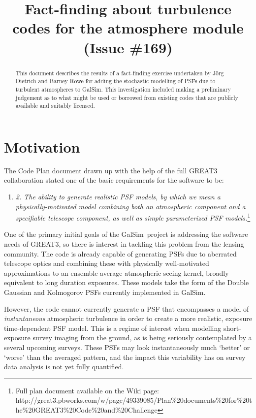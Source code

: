 \documentclass[preprint]{aastex}
\newcommand{\galsim}{{\sc GalSim}}
\begin{document}
\title{Fact-finding about turbulence codes for the atmosphere module (Issue \#169)}

\begin{abstract}
This document describes the results of a fact-finding exercise undertaken by J\"{o}rg Dietrich and 
Barney Rowe for adding the stochastic modelling of PSFs due to turbulent atmospheres to 
\galsim.  This investigation included making a preliminary judgement as to what might be used or 
borrowed from existing codes that are publicly available and suitably licensed.
\end{abstract}

\section{Motivation}
The Code Plan document drawn up with the help of the full GREAT3
collaboration stated one of the basic requirements for the software to be:
\begin{enumerate}
\item[] \emph{2. The ability to generate realistic PSF models, by which we mean
  a physically-motivated model combining both an atmospheric component
  and a specifiable telescope component, as well as simple
  parameterized PSF models.}\footnote{Full plan document available on
  the Wiki page: \newline 
http://great3.pbworks.com/w/page/49339085/Plan\%20documents\%20for\%20the\%20GREAT3\%20Code\%20and\%20Challenge}
\end{enumerate}
One of the primary initial goals of the \galsim\ project is addressing the
software needs of GREAT3, so there is interest in tackling this
problem from the lensing community.  The code is already capable of
generating PSFs due to aberrated telescope optics and combining these
with physically well-motivated approximations to an ensemble average atmospheric seeing
kernel, broadly equivalent to long duration
exposures.  These models take the form of the Double Gaussian and
Kolmogorov PSFs currently implemented in \galsim.

However, the code cannot currently generate a PSF that encompasses a
model of \emph{instantaneous} atmospheric turbulence in order to
create a more
realistic, exposure time-dependent PSF model.  This is a regime of
interest when modelling short-exposure survey imaging from the ground,
as is being seriously contemplated by a several upcoming surveys.
These PSFs may look instantaneously much `better' or `worse' than
the averaged pattern, and the impact this variability has on survey
data analysis is not yet fully quantified.
\end{document}
